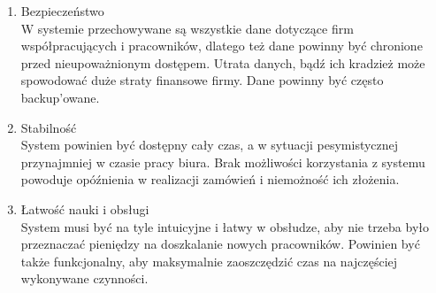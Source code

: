 
\begin{enumerate}
\item Bezpieczeństwo \\
	W systemie przechowywane są wszystkie dane dotyczące firm współpracujących i pracowników, dlatego też dane powinny być chronione przed nieupoważnionym dostępem.
	Utrata danych, bądź ich kradzież może spowodować duże straty finansowe firmy.
	Dane powinny być często backup'owane.

\item Stabilność \\
	System powinien być dostępny cały czas, a w sytuacji pesymistycznej przynajmniej w czasie pracy biura.
	Brak możliwości korzystania z systemu powoduje opóźnienia w realizacji zamówień i niemożność ich złożenia.

\item Łatwość nauki i obsługi \\
	System musi być na tyle intuicyjne i łatwy w obsłudze, aby nie trzeba było przeznaczać pieniędzy na doszkalanie nowych pracowników.
	Powinien być także funkcjonalny, aby maksymalnie zaoszczędzić czas na najczęściej wykonywane czynności.

\end{enumerate}
